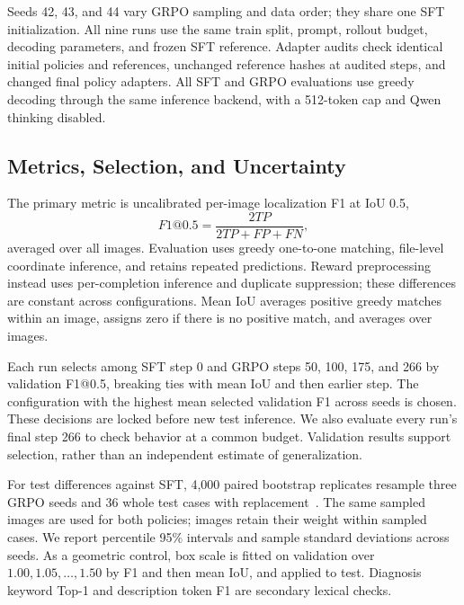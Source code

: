 \documentclass[conference]{IEEEtran}
\begin{document}
Seeds 42, 43, and 44 vary GRPO sampling and data order; they share one SFT initialization. All nine runs use the same train split, prompt, rollout budget, decoding parameters, and frozen SFT reference. Adapter audits check identical initial policies and references, unchanged reference hashes at audited steps, and changed final policy adapters. All SFT and GRPO evaluations use greedy decoding through the same inference backend, with a 512-token cap and Qwen thinking disabled.

\subsection{Metrics, Selection, and Uncertainty}
The primary metric is uncalibrated per-image localization F1 at IoU 0.5,
\begin{equation}
 F1@0.5=\frac{2TP}{2TP+FP+FN},
\end{equation}
averaged over all images. Evaluation uses greedy one-to-one matching, file-level coordinate inference, and retains repeated predictions. Reward preprocessing instead uses per-completion inference and duplicate suppression; these differences are constant across configurations. Mean IoU averages positive greedy matches within an image, assigns zero if there is no positive match, and averages over images.

Each run selects among SFT step 0 and GRPO steps 50, 100, 175, and 266 by validation F1@0.5, breaking ties with mean IoU and then earlier step. The configuration with the highest mean selected validation F1 across seeds is chosen. These decisions are locked before new test inference. We also evaluate every run's final step 266 to check behavior at a common budget. Validation results support selection, rather than an independent estimate of generalization.

For test differences against SFT, 4,000 paired bootstrap replicates resample three GRPO seeds and 36 whole test cases with replacement~\cite{bootstrap}. The same sampled images are used for both policies; images retain their weight within sampled cases. We report percentile 95\% intervals and sample standard deviations across seeds. As a geometric control, box scale is fitted on validation over $1.00,1.05,\ldots,1.50$ by F1 and then mean IoU, and applied to test. Diagnosis keyword Top-1 and description token F1 are secondary lexical checks.
\end{document}
